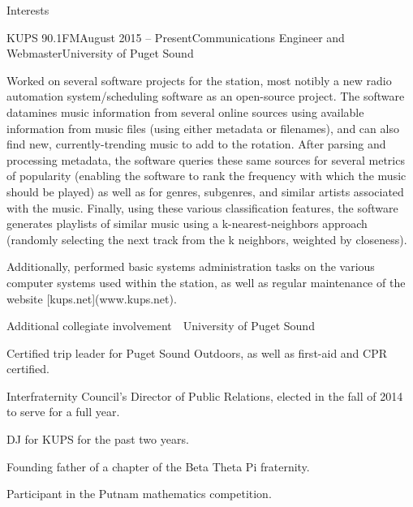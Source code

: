 \documentclass{resume} %
\begin{document}
\begin{rSection}{Interests}
\begin{rSubsection}{KUPS 90.1FM}{August 2015 -- Present}{Communications Engineer and Webmaster}{University of Puget Sound}
\item Worked on several software projects for the station, most notibly a new radio automation system/scheduling software as an open-source project. The software datamines music information from several online sources using available information from music files (using either metadata or filenames), and can also find new, currently-trending music to add to the rotation. After parsing and processing metadata, the software queries these same sources for several metrics of popularity (enabling the software to rank the frequency with which the music should be played) as well as for genres, subgenres, and similar artists associated with the music. Finally, using these various classification features, the software generates playlists of similar music using a k-nearest-neighbors approach (randomly selecting the next track from the k neighbors, weighted by closeness).
\item Additionally, performed basic systems administration tasks on the various computer systems used within the station, as well as regular maintenance of the website [kups.net](www.kups.net).
\end{rSubsection}
\begin{rSubsection}{Additional collegiate involvement}{\ }{\ }{University of Puget Sound}
\item Certified trip leader for Puget Sound Outdoors, as well as first-aid and CPR certified.
\item Interfraternity Council's Director of Public Relations, elected in the fall of 2014 to serve for a full year.
\item DJ for KUPS for the past two years.
\item Founding father of a chapter of the Beta Theta Pi fraternity.
\item Participant in the Putnam mathematics competition.
\end{rSubsection}



\end{rSection}
\end{document}
